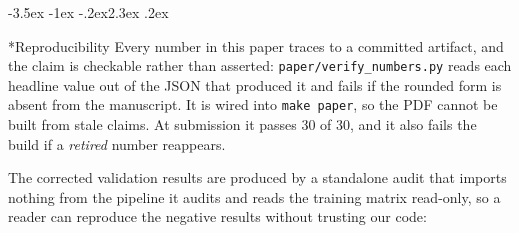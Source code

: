 \documentclass[10pt,twocolumn]{article}
\makeatletter
\renewcommand\section{\@startsection{section}{1}{\z@}%
  {-3.5ex \@plus -1ex \@minus -.2ex}{2.3ex \@plus.2ex}%
  {\normalfont\Large\bfseries\raggedright}}
\makeatother
\begin{document}
\section*{Reproducibility}
\label{sec:repro}
Every number in this paper traces to a committed artifact, and the claim is checkable
rather than asserted: \texttt{paper/verify\_numbers.py} reads each headline value out of
the JSON that produced it and fails if the rounded form is absent from the manuscript. It
is wired into \texttt{make paper}, so the PDF cannot be built from stale claims. At
submission it passes 30 of 30, and it also fails the build if a \emph{retired} number
reappears.

The corrected validation results are produced by a standalone audit that imports nothing
from the pipeline it audits and reads the training matrix read-only, so a reader can
reproduce the negative results without trusting our code:
\end{document}
